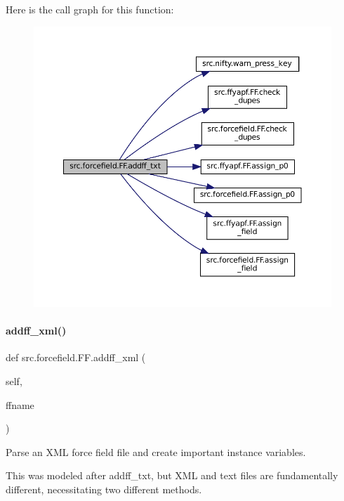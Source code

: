 Here is the call graph for this function\+:
\nopagebreak
\begin{figure}[H]
\begin{center}
\leavevmode
\includegraphics[width=350pt]{classsrc_1_1forcefield_1_1FF_a3baed9ce29ad2b22ec380ffed7fbd237_cgraph}
\end{center}
\end{figure}
\mbox{\label{classsrc_1_1forcefield_1_1FF_a6e68a9d214deb509c95b830e81aa18ce}} 
\paragraph{\texorpdfstring{addff\+\_\+xml()}{addff\_xml()}}
{\footnotesize\ttfamily def src.\+forcefield.\+F\+F.\+addff\+\_\+xml (\begin{DoxyParamCaption}\item[{}]{self,  }\item[{}]{ffname }\end{DoxyParamCaption})}



Parse an X\+ML force field file and create important instance variables. 

This was modeled after addff\+\_\+txt, but X\+ML and text files are fundamentally different, necessitating two different methods.

